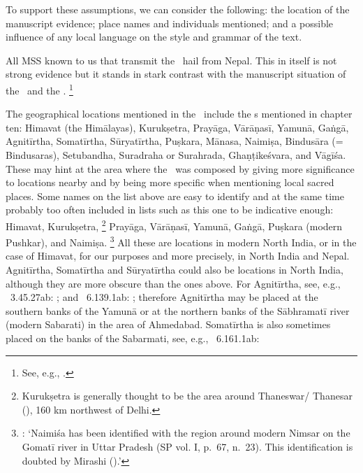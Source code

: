 To support these assumptions, we can consider the following:
the location of the manuscript evidence;
place names and individuals mentioned;
and a possible influence of any local language on
the style and grammar of the text.

All MSS known to us that transmit the \VSS\
hail from Nepal. This in itself is not strong evidence
but it stands in stark contrast with the manuscript situation
of the \SDHS\ and the \SDHU.%
		\footnote{See, e.g., .}

The geographical locations 
mentioned in the \VSS\ include the
s mentioned in chapter ten:
Himavat (the Himālayas),
Kurukṣetra,
Prayāga,
Vārāṇasī,
Yamunā,
Gaṅgā,
Agnitīrtha, %
Somatīrtha, %
Sūryatīrtha, %
Puṣkara, %
Mānasa, %
Naimiṣa, %
Bindusāra (= Bindusaras), %
Setubandha, %
Suradraha or \linebreak Sura\-hrada, %
Ghaṇṭikeśvara,
and Vāgīśa.
These may hint at the area where the \VSS\ was
composed by giving more significance to 
locations nearby and by being more specific when
mentioning local sacred places.
Some names on the list above are 
easy to identify and at the same
time probably too often included in lists such as this one
to be indicative enough: 
Himavat, Kurukṣetra,%
	\footnote{Kurukṣetra is generally thought to be the area
		around Thaneswar\thinspace /\thinspace
		Thanesar (), 
		160 km northwest of Delhi.}	
Prayāga, Vārāṇasī, Yamunā,
Gaṅgā, Puṣkara (modern Pushkar), and Naimiṣa.%
		\footnote{: 
		`Naimiśa has been identified with the region around 
		modern Nimsar on the Gomatī river in Uttar Pradesh
		(SP vol. I, p.~67, n.~23).
		This identification is doubted by Mirashi (\citeyear{MirashiNaimisa}).'}
All these are locations in modern North India, or in the case of Himavat,
for our purposes and more precisely, in North India and Nepal.
Agnitīrtha, Somatīrtha and Sūryatīrtha could also
be locations in North India, although they are
more obscure than the ones above.
For Agnitīrtha, see, e.g., \PadmaP\ 3.45.27ab:      
; and  
\PadmaP\  6.139.1ab:    
; 
therefore Agnitīrtha may be placed at the southern
banks of the Yamunā or at the northern banks of
the Sābhramatī river (modern Sabarati) in the area of
Ahmedabad.
Somatīrtha is also sometimes placed on the banks
of the Sabarmati, see, e.g., \PadmaP\  6.161.1ab:

